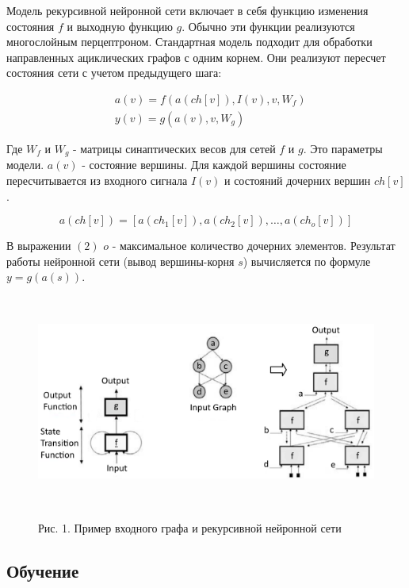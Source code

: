\documentclass[14pt]{article}
\begin{document}
Модель рекурсивной нейронной сети включает в себя функцию изменения состояния $f$ и выходную функцию $g$. Обычно эти функции реализуются многослойным перцептроном. Стандартная модель подходит для обработки направленных ациклических графов с одним корнем. Они реализуют пересчет состояния сети с учетом предыдущего шага:


\begin{eqnarray}
&a(v) = f(a(ch[v]), I(v), v, W_f)\nonumber\\
&y(v) = g(a(v), v, W_g)
\end{eqnarray}


Где $W_f$ и $W_g$ - матрицы синаптических весов для сетей $f$ и $g$. Это параметры модели. $a(v)$ - состояние вершины. Для каждой вершины состояние пересчитывается из входного сигнала $I(v)$ и состояний дочерних вершин $ch[v]$.


\begin{equation}
\label{trivial}
a(ch[v]) = [a(ch_1[v]), a(ch_2[v]), \dots, a(ch_o[v])]
\end{equation}


В выражении $(2)$ $o$ - максимальное количество дочерних элементов. Результат работы нейронной сети (вывод вершины-корня $s$) вычисляется по формуле $y = g(a(s))$.


\begin{figure}[!h]
    \centering
        \includegraphics[height=7cm]{Fig1.png}
    \parbox[t][1.2cm][c]{16cm}{
        \centering
        Рис. 1. Пример входного графа и рекурсивной  нейронной сети
    }
\end{figure}




\subsection{Обучение}
\end{document}
